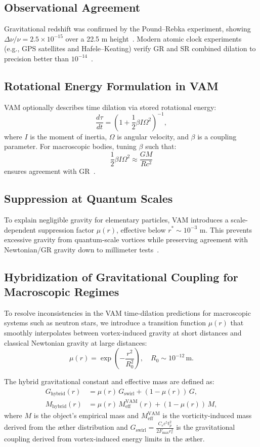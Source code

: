 \subsection*{Observational Agreement}
Gravitational redshift was confirmed by the Pound–Rebka experiment, showing $\Delta\nu/\nu = 2.5\times 10^{-15}$ over a 22.5 m height~\cite{pound1960apparent}. Modern atomic clock experiments (e.g., GPS satellites and Hafele–Keating) verify GR and SR combined dilation to precision better than $10^{-14}$~\cite{ashby2003relativity}.

\subsection*{Rotational Energy Formulation in VAM}
VAM optionally describes time dilation via stored rotational energy:
\[
    \frac{d\tau}{dt} = \left(1 + \frac{1}{2}\beta I \Omega^2\right)^{-1},
\]
where $I$ is the moment of inertia, $\Omega$ is angular velocity, and $\beta$ is a coupling parameter. For macroscopic bodies, tuning $\beta$ such that:
\[
    \frac{1}{2} \beta I \Omega^2 \approx \frac{GM}{Rc^2}
\]
ensures agreement with GR~\cite{iskandarani2025VAM2}.

\subsection*{Suppression at Quantum Scales}
To explain negligible gravity for elementary particles, VAM introduces a scale-dependent suppression factor $\mu(r)$, effective below $r^* \sim 10^{-3}$ m. This prevents excessive gravity from quantum-scale vortices while preserving agreement with Newtonian/GR gravity down to millimeter tests~\cite{adelberger2003tests}.

\subsection{Hybridization of Gravitational Coupling for Macroscopic Regimes}

To resolve inconsistencies in the VAM time-dilation predictions for macroscopic systems such as neutron stars, we introduce a transition function \(\mu(r)\) that smoothly interpolates between vortex-induced gravity at short distances and classical Newtonian gravity at large distances:
\[
    \mu(r) = \exp\left(-\frac{r^2}{R_0^2}\right), \quad R_0 \sim 10^{-12} \, \mathrm{m}.
\]

The hybrid gravitational constant and effective mass are defined as:
\begin{align*}
    G_{\text{hybrid}}(r) &= \mu(r) \, G_{\text{swirl}} + (1 - \mu(r)) \, G, \\
    M_{\text{hybrid}}(r) &= \mu(r) \, M_{\text{eff}}^{\text{VAM}}(r) + (1 - \mu(r)) \, M,
\end{align*}
where \(M\) is the object's empirical mass and \(M_{\text{eff}}^{\text{VAM}}\) is the vorticity-induced mass derived from the æther distribution and $G_{\text{swirl}} = \frac{C_e c^5 t_p^2}{2 F_{\max} r_c^2}$ is the gravitational coupling derived from vortex-induced energy limits in the æther.


